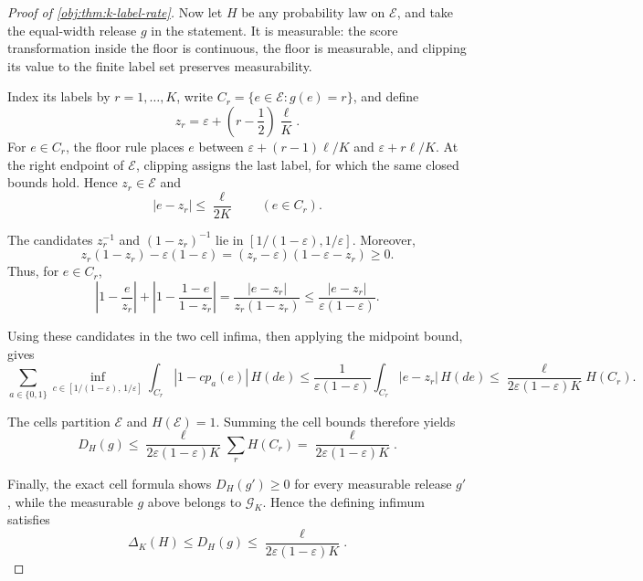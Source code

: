 \begin{proof}[Proof of \cref{obj:thm:k-label-rate}]
Now let \(H\) be any probability law on \(\mathcal E\), and take the equal-width release \(g\) in the statement. It is measurable: the score transformation inside the floor is continuous, the floor is measurable, and clipping its value to the finite label set preserves measurability. %

Index its labels by \(r=1,\ldots,K\), write \(C_r=\{e\in\mathcal E:g(e)=r\}\), and define
\[
z_r=\varepsilon+\left(r-\frac12\right)\frac{\ell}{K}.
\]
For \(e\in C_r\), the floor rule places \(e\) between \(\varepsilon+(r-1)\ell/K\) and \(\varepsilon+r\ell/K\). At the right endpoint of \(\mathcal E\), clipping assigns the last label, for which the same closed bounds hold. Hence \(z_r\in\mathcal E\) and
\[
|e-z_r|\leq\frac{\ell}{2K}\qquad(e\in C_r).
\] %

The candidates \(z_r^{-1}\) and \((1-z_r)^{-1}\) lie in \([1/(1-\varepsilon),1/\varepsilon]\). Moreover,
\[
z_r(1-z_r)-\varepsilon(1-\varepsilon)
=(z_r-\varepsilon)(1-\varepsilon-z_r)\geq0.
\]
Thus, for \(e\in C_r\),
\[
\left|1-\frac e{z_r}\right|
+\left|1-\frac{1-e}{1-z_r}\right|
=\frac{|e-z_r|}{z_r(1-z_r)}
\leq \frac{|e-z_r|}{\varepsilon(1-\varepsilon)}.
\] %

Using these candidates in the two cell infima, then applying the midpoint bound, gives
\[
\sum_{a\in\{0,1\}}
\inf_{c\in[1/(1-\varepsilon),\,1/\varepsilon]}
\int_{C_r}|1-cp_a(e)|\,H(de)
\leq
\frac{1}{\varepsilon(1-\varepsilon)}
\int_{C_r}|e-z_r|\,H(de)
\leq
\frac{\ell}{2\varepsilon(1-\varepsilon)K}H(C_r).
\] %

The cells partition \(\mathcal E\) and \(H(\mathcal E)=1\). Summing the cell bounds therefore yields
\[
D_H(g)\leq
\frac{\ell}{2\varepsilon(1-\varepsilon)K}
\sum_r H(C_r)
=
\frac{\ell}{2\varepsilon(1-\varepsilon)K}.
\] %

Finally, the exact cell formula shows \(D_H(g')\geq0\) for every measurable release \(g'\), while the measurable \(g\) above belongs to \(\mathcal G_K\). Hence the defining infimum satisfies
\[
\Delta_K(H)\leq D_H(g)
\leq\frac{\ell}{2\varepsilon(1-\varepsilon)K}.
\] %
\end{proof}

